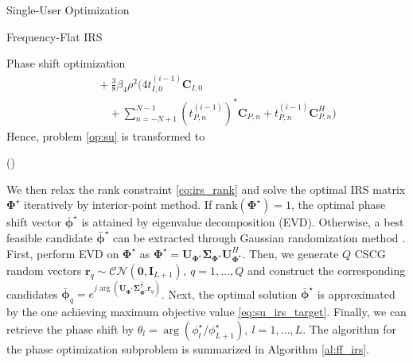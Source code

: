 \documentclass{IEEEtran}
\begin{document}
\begin{section}{Single-User Optimization}
\begin{subsection}{Frequency-Flat IRS}
\begin{subsubsection}{Phase shift optimization}
\begin{equation}
\begin{split}
					& \quad+ \frac{3}{8} \beta_4 \rho^2 \Biggl(4 t_{I,0}^{(i-1)} \boldsymbol{C}_{I,0}\\
					& \quad \quad + \sum_{n=-N+1}^{N-1} (t_{P,n}^{(i-1)})^*\boldsymbol{C}_{P,n} + t_{P,n}^{(i-1)}\boldsymbol{C}_{P,n}^H \Biggl)
				\end{split}
			\end{equation}
			Hence, problem \ref{op:su} is transformed to
			\begin{maxi!}
				{\boldsymbol{\boldsymbol{\Phi}}}{(\boldsymbol{\Phi})}{\label{op:su_irs}}{\label{eq:su_irs_target}}
			\end{maxi!}
			We then relax the rank constraint \ref{co:irs_rank} and solve the optimal IRS matrix $\boldsymbol{\Phi}^{\star}$ iteratively by interior-point method. If $\mathrm{rank}(\boldsymbol{\Phi}^{\star})=1$, the optimal phase shift vector $\bar{\boldsymbol{\phi}}^\star$ is attained by eigenvalue decomposition (EVD). Otherwise, a best feasible candidate $\bar{\boldsymbol{\phi}}^\star$ can be extracted through Gaussian randomization method \cite{Huang2010}. First, perform EVD on $\boldsymbol{\Phi}^{\star}$ as $\boldsymbol{\Phi}^{\star}=\boldsymbol{U}_{\boldsymbol{\Phi}^{\star}}\boldsymbol{\Sigma}_{\boldsymbol{\Phi}^{\star}}\boldsymbol{U}_{\boldsymbol{\Phi}^{\star}}^H$. Then, we generate $Q$ CSCG random vectors $\boldsymbol{r}_q \sim \mathcal{CN}(\boldsymbol{0},\boldsymbol{I}_{L+1}),\ q=1,\dots,Q$ and construct the corresponding candidates $\bar{\boldsymbol{\phi}}_q=e^{j\arg\left(\boldsymbol{U}_{\boldsymbol{\Phi}^{\star}}\boldsymbol{\Sigma}_{\boldsymbol{\Phi}^{\star}}^{\frac{1}{2}}\boldsymbol{r}_q\right)}$. Next, the optimal solution $\bar{\boldsymbol{\phi}}^\star$ is approximated by the one achieving maximum objective value \ref{eq:su_irs_target}. Finally, we can retrieve the phase shift by $\theta_l=\arg(\phi_l^\star/\phi_{L+1}^\star), \ l=1,\dots,L$. The algorithm for the phase optimization subproblem is summarized in Algorithm \ref{al:ff_irs}.
			\begin{algorithm}
				\caption{FF-IRS: Phase Shift Optimization}
				\label{al:ff_irs}

\end{algorithm}
\end{subsubsection}
\end{subsection}
\end{section}
\end{document}
